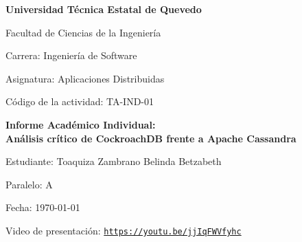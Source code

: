 \documentclass[11pt,a4paper]{article}
\newcommand{\sistemaA}{CockroachDB}      %
\newcommand{\sistemaB}{Apache Cassandra} %
\newcommand{\universidad}{Universidad Técnica Estatal de Quevedo}
\newcommand{\facultad}{Facultad de Ciencias de la Ingeniería}
\newcommand{\carrera}{Ingeniería de Software}
\newcommand{\asignatura}{Aplicaciones Distribuidas}
\newcommand{\codigoactividad}{TA-IND-01}
\newcommand{\estudiante}{Toaquiza Zambrano Belinda Betzabeth}
\newcommand{\paralelo}{A}
\newcommand{\titulodoc}{Análisis crítico de \sistemaA{} frente a \sistemaB{}}
\begin{document}
\begin{titlepage}
  \thispagestyle{empty}
  \centering
  {\Large\bfseries \universidad\par}
  \vspace{0.4cm}
  {\large \facultad\par}
  \vspace{0.2cm}
  {\large Carrera: \carrera\par}
  \vspace{2.2cm}
  {\large Asignatura: \asignatura\par}
  \vspace{0.2cm}
  {\large Código de la actividad: \codigoactividad\par}
  \vspace{1.6cm}
  {\LARGE\bfseries Informe Académico Individual:\\[0.3cm] \titulodoc\par}
  \vspace{2.2cm}
  {\large Estudiante: \estudiante\par}
  \vspace{0.2cm}
  {\large Paralelo: \paralelo\par}
  \vspace{0.2cm}
  {\large Fecha: \today\par}
  \vspace{0.2cm}
  {\large Video de presentación: \href{https://youtu.be/jjIqFWVfyhc}{\textcolor[HTML]{1D9BF0}{\nolinkurl{https://youtu.be/jjIqFWVfyhc}}}\par}
  \vspace{0.6cm}
  \vfill
\end{titlepage}
\setcounter{page}{1}

\clearpage
\end{document}
